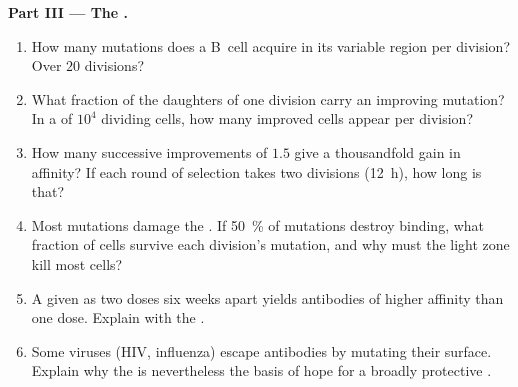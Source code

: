 \begin{problem}
\medskip
\noindent\textbf{Part III --- The .}
\begin{enumerate}[resume]
  \item How many mutations does a B~cell acquire in its variable region
        per division? Over $20$ divisions?
  \item What fraction of the daughters of one division carry an
        improving mutation? In a  of $10^{4}$ dividing
        cells, how many improved cells appear per division?
  \item How many successive improvements of $1.5$ give a thousandfold
        gain in affinity? If each round of selection takes two
        divisions (\qty{12}{h}), how long is that?
  \item Most mutations damage the . If \qty{50}{\%} of mutations
        destroy binding, what fraction of cells survive each division's
        mutation, and why must the light zone kill most cells?
  \item A  given as two doses six weeks apart yields antibodies
        of higher affinity than one dose. Explain with the .
  \item Some viruses (HIV, influenza) escape antibodies by mutating
        their surface. Explain why the  is nevertheless
        the basis of hope for a broadly protective .
\end{enumerate}


\end{problem}
